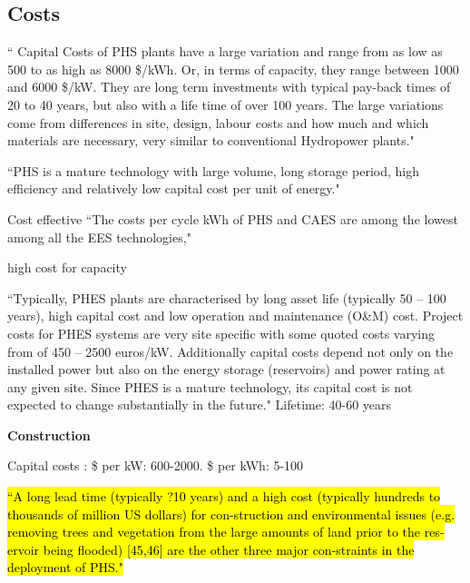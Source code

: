 
\subsection{Costs}


``
Capital Costs of PHS plants have a large variation and range from as low as 500 to as
high as 8000 \$/kWh. Or, in terms of capacity, they range between 1000 and 6000
\$/kW. They are long term investments with typical pay-back times of 20 to 40 years,
but also with a life time of over 100 years. The large variations come from differences
in site, design, labour costs and how much and which materials are necessary, very
similar to conventional Hydropower plants."
\citep{Kocher-Oberlehner2014}

``PHS is a mature technology with large volume, long storage period, high efficiency and relatively low capital cost per unit of energy." \citep{Chen2009}

Cost effective \citep{ESMStudy2010, Ramirez2016}
``The costs per cycle kWh of PHS and CAES are among
the lowest among all the EES technologies," \citep{Chen2009}

high cost for capacity \citep{Sterner2017}

``Typically, PHES plants are characterised by long asset life (typically 50 – 100 years), high capital
cost and low operation and maintenance (O\&M) cost. Project costs for PHES systems are very site
specific with some quoted costs varying from of 450 – 2500 euros/kW. Additionally capital costs
depend not only on the installed power but also on the energy storage (reservoirs) and power
rating at any given site. Since PHES is a mature technology, its capital cost is not expected to
change substantially in the future."
\citep{Zach2012}
Lifetime: 40-60 years \citep{Chen2009}

\textbf{Construction}

Capital costs \citep{Chen2009}: 
\$ per kW: 600-2000.
\$ per kWh: 5-100

\hl{``A long lead time (typically ?10 years) and a high cost (typically hundreds to thousands of million US dollars) for con-struction and environmental issues (e.g. removing trees and
vegetation from the large amounts of land prior to the res-ervoir being flooded) [45,46] are the other three major con-straints in the deployment of PHS."} \citep{Chen2009}

